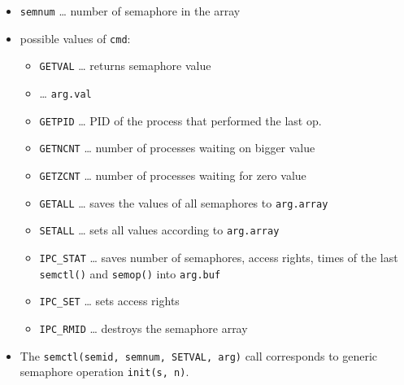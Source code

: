 
\begin{slide}
\setlength{\baselineskip}{0.9\baselineskip}
\begin{itemize}
\item \texttt{semnum} \dots{} number of semaphore in the array
\item possible values of \texttt{cmd}: 
    \begin{itemize}
    \item \texttt{GETVAL} \dots{} returns semaphore value
    \item {} \dots{} 
    \texttt{arg.val}
    \item \texttt{GETPID} \dots{} PID of the process that performed the last op.
    \item \texttt{GETNCNT} \dots{} number of processes waiting on bigger value
    \item \texttt{GETZCNT} \dots{} number of processes waiting for zero value
    \item \texttt{GETALL} \dots{} saves the values of all semaphores to
    \texttt{arg.array}
    \item \texttt{SETALL} \dots{} sets all values according to
    \texttt{arg.array}
    \item \texttt{IPC\_STAT} \dots{} saves number of semaphores, access rights,
times of the last \texttt{semctl()} and \texttt{semop()} into \texttt{arg.buf}
    \item \texttt{IPC\_SET} \dots{} sets access rights
    \item \texttt{IPC\_RMID} \dots{} destroys the semaphore array
    \end{itemize}
\end{itemize}
\end{slide}

\begin{itemize}
\item The \texttt{semctl(semid, semnum, SETVAL, arg)} call corresponds to
generic semaphore operation \texttt{init(s,~n)}.
\end{itemize}



